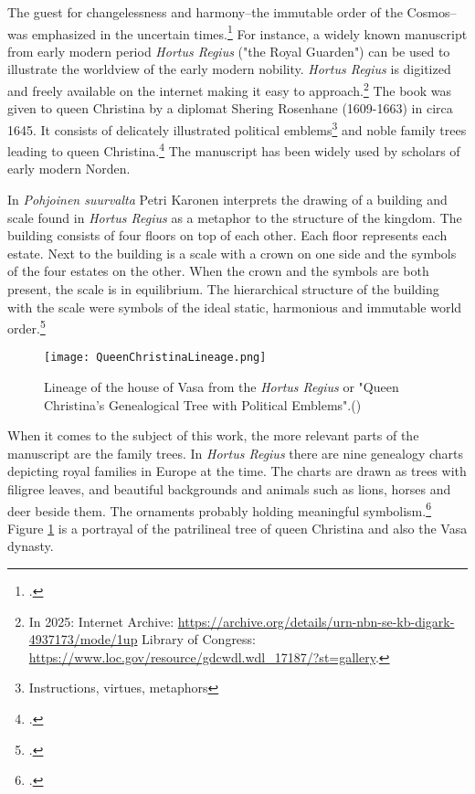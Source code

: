 The guest for changelessness and harmony–the immutable order of the Cosmos–was emphasized in the uncertain times.\footcite[p. 150.]{hakanenEtAll2020} For instance, a widely known manuscript from early modern period \textit{Hortus Regius} ("the Royal Guarden") can be used to illustrate the worldview of the early modern nobility. \textit{Hortus Regius} is digitized and freely available on the internet making it easy to approach.\footnote{In 2025: Internet Archive: \url{https://archive.org/details/urn-nbn-se-kb-digark-4937173/mode/1up} Library of Congress: \url{https://www.loc.gov/resource/gdcwdl.wdl\_17187/?st=gallery}.} The book was given to queen Christina by a diplomat Shering Rosenhane (1609-1663) in circa 1645. It consists of delicately illustrated political emblems\footnote{Instructions, virtues, metaphors} and noble family trees leading to queen Christina.\footcites{congresslibrary}[p. 271.]{BlennowAnna} The manuscript has been widely used by scholars of early modern Norden.

In \textit{Pohjoinen suurvalta} Petri Karonen interprets the drawing of a building and scale found in \textit{Hortus Regius} as a metaphor to the structure of the kingdom. The building consists of four floors on top of each other. Each floor represents each estate. Next to the building is a scale with a crown on one side and the symbols of the four estates on the other. When the crown and the symbols are both present, the scale is in equilibrium. The hierarchical structure of the building with the scale were symbols of the ideal static, harmonious and immutable world order.\footcite[pp. 162-165.]{pSuurvalta}

\begin{figure}
	\texttt{[image: QueenChristinaLineage.png]}
	\caption[Lineage of the house of Vasa from the \textit{Hortus Regius}]{Lineage of the house of Vasa from the \textit{Hortus Regius} or "Queen Christina's Genealogical Tree with Political Emblems".(\cite{hortusregius})} 
	\centering
	\label{queenlineage}
\end{figure}

When it comes to the subject of this work, the more relevant parts of the manuscript are the family trees. In \textit{Hortus Regius} there are nine genealogy charts depicting royal families in Europe at the time. The charts are drawn as trees with filigree leaves, and beautiful backgrounds and animals such as lions, horses and deer beside them. The ornaments probably holding meaningful symbolism.\footcite{hortusregius} Figure \ref{queenlineage} is a portrayal of the patrilineal tree of queen Christina and also the Vasa dynasty.

